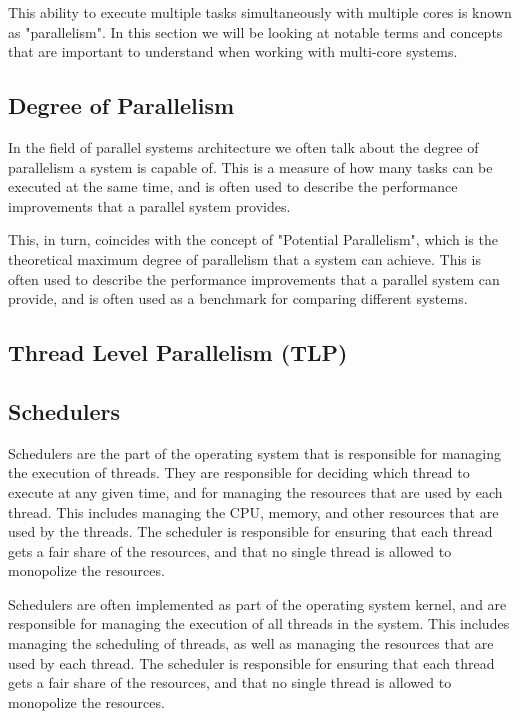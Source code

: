 \documentclass[12pt,a4paper]{article}
\begin{document}
This ability to execute multiple tasks simultaneously with multiple cores is known as "parallelism". In this section we will be looking at notable terms and concepts that are important to understand when working with multi-core systems.

\subsection{Degree of Parallelism}

In the field of parallel systems architecture we often talk about the degree of parallelism a system is capable of. This is a measure of how many tasks can be executed at the same time, and is often used to describe the performance improvements that a parallel system provides.

This, in turn, coincides with the concept of "Potential Parallelism", which is the theoretical maximum degree of parallelism that a system can achieve. This is often used to describe the performance improvements that a parallel system can provide, and is often used as a benchmark for comparing different systems.

\subsection{Thread Level Parallelism (TLP)}

\subsection{Schedulers}

Schedulers are the part of the operating system that is responsible for managing the execution of threads. They are responsible for deciding which thread to execute at any given time, and for managing the resources that are used by each thread. This includes managing the CPU, memory, and other resources that are used by the threads. The scheduler is responsible for ensuring that each thread gets a fair share of the resources, and that no single thread is allowed to monopolize the resources.

Schedulers are often implemented as part of the operating system kernel, and are responsible for managing the execution of all threads in the system. This includes managing the scheduling of threads, as well as managing the resources that are used by each thread. The scheduler is responsible for ensuring that each thread gets a fair share of the resources, and that no single thread is allowed to monopolize the resources.
\end{document}
